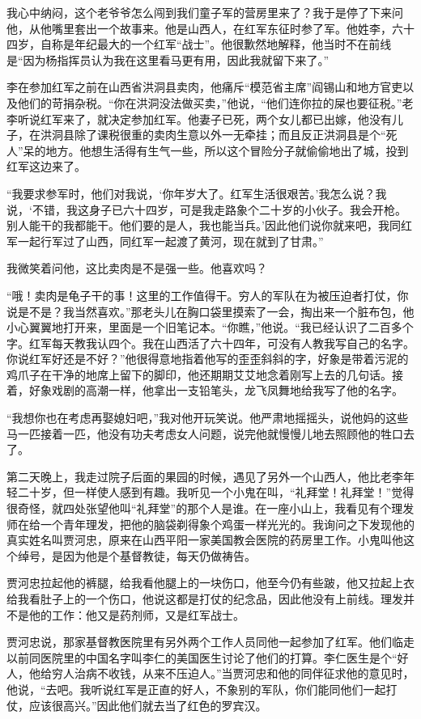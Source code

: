 \documentclass[10pt]{book}
\begin{document}
我心中纳闷，这个老爷爷怎么闯到我们童子军的营房里来了？我于是停了下来问他，从他嘴里套出一个故事来。他是山西人，在红军东征时参了军。他姓李，六十四岁，自称是年纪最大的一个红军“战士”。他很歉然地解释，他当时不在前线是“因为杨指挥员认为我在这里看马更有用，因此我就留下来了。”

李在参加红军之前在山西省洪洞县卖肉，他痛斥“模范省主席”阎锡山和地方官吏以及他们的苛捐杂税。“你在洪洞没法做买卖，”他说，“他们连你拉的屎也要征税。”老李听说红军来了，就决定参加红军。他妻子已死，两个女儿都已出嫁，他没有儿子，在洪洞县除了课税很重的卖肉生意以外一无牵挂；而且反正洪洞县是个“死人”呆的地方。他想生活得有生气一些，所以这个冒险分子就偷偷地出了城，投到红军这边来了。

“我要求参军时，他们对我说，‘你年岁大了。红军生活很艰苦。’我怎么说？我说，‘不错，我这身子已六十四岁，可是我走路象个二十岁的小伙子。我会开枪。别人能干的我都能干。他们要的是人，我也能当兵。’因此他们说你就来吧，我同红军一起行军过了山西，同红军一起渡了黄河，现在就到了甘肃。”

我微笑着问他，这比卖肉是不是强一些。他喜欢吗？

“哦！卖肉是龟子干的事！这里的工作值得干。穷人的军队在为被压迫者打仗，你说是不是？我当然喜欢。”那老头儿在胸口袋里摸索了一会，掏出来一个脏布包，他小心翼翼地打开来，里面是一个旧笔记本。“你瞧，”他说。“我已经认识了二百多个字。红军每天教我认四个。我在山西活了六十四年，可没有人教我写自己的名字。你说红军好还是不好？”他很得意地指着他写的歪歪斜斜的字，好象是带着污泥的鸡爪子在干净的地席上留下的脚印，他还期期艾艾地念着刚写上去的几句话。接着，好象戏剧的高潮一样，他拿出一支铅笔头，龙飞凤舞地给我写了他的名字。

“我想你也在考虑再娶媳妇吧，”我对他开玩笑说。他严肃地摇摇头，说他妈的这些马一匹接着一匹，他没有功夫考虑女人问题，说完他就慢慢儿地去照顾他的牲口去了。

第二天晚上，我走过院子后面的果园的时候，遇见了另外一个山西人，他比老李年轻二十岁，但一样使人感到有趣。我听见一个小鬼在叫，“礼拜堂！礼拜堂！”觉得很奇怪，就四处张望他叫“礼拜堂”的那个人是谁。在一座小山上，我看见有个理发师在给一个青年理发，把他的脑袋剃得象个鸡蛋一样光光的。我询问之下发现他的真实姓名叫贾河忠，原来在山西平阳一家美国教会医院的药房里工作。小鬼叫他这个绰号，是因为他是个基督教徒，每天仍做祷告。

贾河忠拉起他的裤腿，给我看他腿上的一块伤口，他至今仍有些跛，他又拉起上衣给我看肚子上的一个伤口，他说这都是打仗的纪念品，因此他没有上前线。理发并不是他的工作：他又是药剂师，又是红军战士。

贾河忠说，那家基督教医院里有另外两个工作人员同他一起参加了红军。他们临走以前同医院里的中国名字叫李仁的美国医生讨论了他们的打算。李仁医生是个“好人，他给穷人治病不收钱，从来不压迫人。”当贾河忠和他的同伴征求他的意见时，他说，“去吧。我听说红军是正直的好人，不象别的军队，你们能同他们一起打仗，应该很高兴。”因此他们就去当了红色的罗宾汉。
\end{document}
